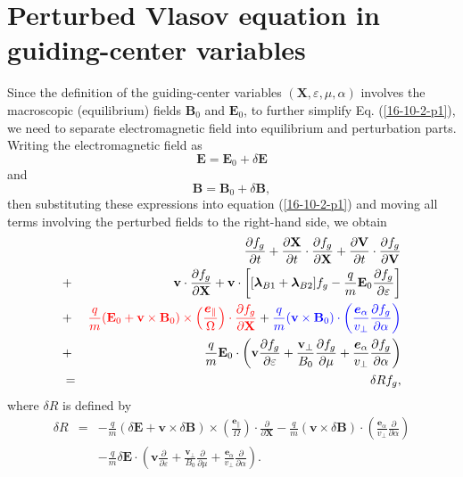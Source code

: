\documentclass{article}
\newcommand{\tmcolor}[2]{{\color{#1}{#2}}}
\newcommand{\tmmathbf}[1]{\ensuremath{\boldsymbol{#1}}}
\begin{document}
\section{Perturbed Vlasov equation in guiding-center variables}

Since the definition of the guiding-center variables $(\mathbf{X},
\varepsilon, \mu, \alpha)$ involves the macroscopic (equilibrium) fields
$\mathbf{B}_0$ and $\mathbf{E}_0$, to further simplify Eq. (\ref{16-10-2-p1}),
we need to separate electromagnetic field into equilibrium and perturbation
parts. Writing the electromagnetic field as
\begin{equation}
  \label{16-10-27-1} \mathbf{E}=\mathbf{E}_0 + \delta \mathbf{E}
\end{equation}
and
\begin{equation}
  \label{16-10-27-2} \mathbf{B}=\mathbf{B}_0 + \delta \mathbf{B},
\end{equation}
then substituting these expressions into equation (\ref{16-10-2-p1}) and
moving all terms involving the perturbed fields to the right-hand side, we
obtain
\begin{eqnarray}
  &  & \frac{\partial f_g}{\partial t} + \frac{\partial \mathbf{X}}{\partial
  t} \cdot \frac{\partial f_g}{\partial \mathbf{X}} + \frac{\partial
  \mathbf{V}}{\partial t} \cdot \frac{\partial f_g}{\partial \mathbf{V}}
  \nonumber\\
  & + & \mathbf{v} \cdot \frac{\partial f_g}{\partial \mathbf{X}} +\mathbf{v}
  \cdot \left[ [\tmmathbf{\lambda}_{B 1} +\tmmathbf{\lambda}_{B 2}] f_g -
  \frac{q}{m} \mathbf{E}_0 \frac{\partial f_g}{\partial \varepsilon} \right]
  \nonumber\\
  & + & \tmcolor{red}{\frac{q}{m} (\mathbf{E}_0 +\mathbf{v} \times
  \mathbf{B}_0) \times \left( \frac{\tmmathbf{e}_{\parallel}}{\Omega}  \right)
  \cdot \frac{\partial f_g}{\partial \mathbf{X}}} + \tmcolor{blue}{\frac{q}{m}
  (\mathbf{v} \times \mathbf{B}_0) \cdot \left(
  \frac{\tmmathbf{e}_{\alpha}}{v_{\perp}}  \frac{\partial f_g}{\partial
  \alpha} \right)} \nonumber\\
  & + & \frac{q}{m} \mathbf{E}_0 \cdot \left( \mathbf{v} \frac{\partial
  f_g}{\partial \varepsilon} + \frac{\mathbf{v}_{\perp}}{B_0}  \frac{\partial
  f_g}{\partial \mu} + \frac{\tmmathbf{e}_{\alpha}}{v_{\perp}}  \frac{\partial
  f_g}{\partial \alpha} \right) \nonumber\\
  & = & \delta R f_g,  \label{16-10-2-p2}
\end{eqnarray}
where $\delta R$ is defined by
\begin{eqnarray}
  \delta R & = & - \frac{q}{m} (\delta \mathbf{E}+\mathbf{v} \times \delta
  \mathbf{B}) \times \left( \frac{\tmmathbf{e}_{\parallel}}{\Omega}  \right)
  \cdot \frac{\partial}{\partial \mathbf{X}} - \frac{q}{m} (\mathbf{v} \times
  \delta \mathbf{B}) \cdot \left( \frac{\tmmathbf{e}_{\alpha}}{v_{\perp}} 
  \frac{\partial}{\partial \alpha} \right) \nonumber\\
  &  & - \frac{q}{m} \delta \mathbf{E} \cdot \left( \mathbf{v}
  \frac{\partial}{\partial \varepsilon} + \frac{\mathbf{v}_{\perp}}{B_0} 
  \frac{\partial}{\partial \mu} + \frac{\tmmathbf{e}_{\alpha}}{v_{\perp}} 
  \frac{\partial}{\partial \alpha} \right) .  \label{16-10-6-1}
\end{eqnarray}
\end{document}
